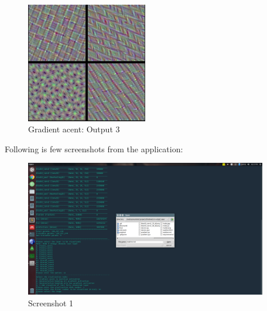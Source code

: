 \documentclass{article} %
\begin{document}
\begin{figure}[h]
  \begin{center}
  \includegraphics[width=200]{m1_3.png}
  \end{center}
  \caption{Gradient acent: Output 3}
\end{figure}

Following is few screenshots from the application:
\begin{figure}[h]
  \begin{center}
  \includegraphics[width=400]{ss1.png}
  \end{center}
  \caption{Screenshot 1}
\end{figure}
\end{document}
